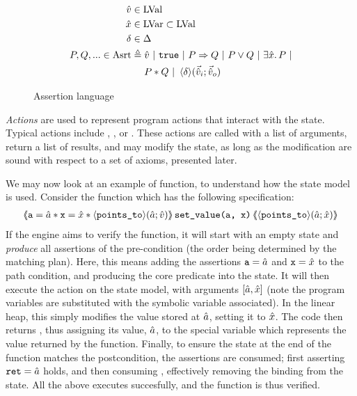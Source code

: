 \begin{figure}
	\begin{align*}
	\hat{v} &\in \text{LVal}\\
	\hat{x} &\in \text{LVar} \subset \text{LVal}\\
	\delta &\in \Delta \\
	P, Q, ... \in \text{Asrt} &\triangleq \hat{v} ~|~ \texttt{true} ~|~ P \Rightarrow Q ~|~ P \lor Q ~|~ \exists \hat{x} \ldotp P ~|\\
	&\quad~ P * Q ~|~ \left<\delta\right>\!(\vec{\hat{v}}_i;\vec{\hat{v}}_o)
	\end{align*}
	\caption{Assertion language}
	\label{fig:assertion-language}
\end{figure}

\emph{Actions} are used to represent program actions that interact with the state. Typical actions include \load{}, \store{}, \alloc{} or \free. These actions are called with a list of arguments, return a list of results, and may modify the state, as long as the modification are sound with respect to a set of axioms, presented later.

We may now look at an example of function, to understand how the state model is used. Consider the function  which has the following specification:
\begin{align*}%
\ESLtriple
	{\code{a}=\sym a * \code{x} = \sym x * \corepred{\pointsto}{\sym a}{\sym v}}
	{set\_value(a, x)}
	{\corepred{\pointsto}{\sym a}{\sym x}}
\end{align*}%
If the engine aims to verify the function, it will start with an empty state and \emph{produce} all assertions of the pre-condition (the order being determined by the matching plan). Here, this means adding the assertions $\texttt{a} = \hat{a}$ and $\texttt{x} = \hat{x}$ to the path condition, and producing the core predicate  into the state. It will then execute the action  on the state model, with arguments $[\hat{a}, \hat{x}]$ (note the program variables are substituted with the symbolic variable associated). In the linear heap, this simply modifies the value stored at $\hat{a}$, setting it to $\hat{x}$. The code then returns , thus assigning its value, $\hat{a}$, to the special variable  which represents the value returned by the function. Finally, to ensure the state at the end of the function matches the postcondition, the assertions are consumed; first asserting $\texttt{ret} = \hat{a}$ holds, and then consuming , effectively removing the binding from the state. All the above executes succesfully, and the function is thus verified.

